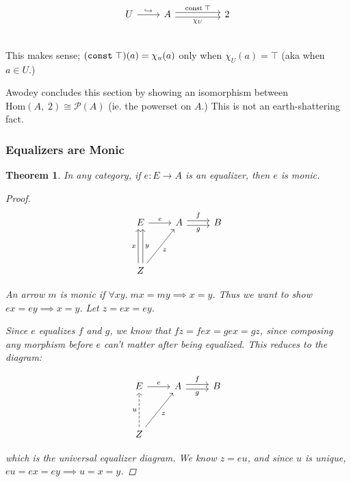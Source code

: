 \documentclass[]{article}
\newtheorem{theorem}{Theorem}
\renewcommand{\hom}[2]{\ensuremath{\text{Hom}(#1,\;#2)}}
\newcommand{\tfarr}[4][\to]{\ensuremath{#2 : #3 #1 #4}}
\begin{document}
$$\begin{tikzcd}
  U\arrow{r}{\hookrightarrow} & A \arrow[shift right=1,swap]{rr}{\chi_U}
  \arrow[shift left=1]{rr}{\text{const}\;\top} &  & 2 \\
\end{tikzcd}$$

This makes sense; $(\text{\texttt{const}}\;\top)(a) = \chi_u(a)$ only when
$\chi_U(a) = \top$ (aka when $a \in U$.)

Awodey concludes this section by showing an isomorphism between $\hom{A}{2}
\cong \mathcal{P}(A)$ (ie. the powerset on $A$.) This is not an earth-shattering
fact.

\subsubsection{Equalizers are Monic}

\begin{theorem}
  In any category, if \tfarr{e}{E}{A} is an equalizer, then $e$ is monic.

  \begin{proof}
$$\begin{tikzcd}
  E\arrow{r}{e} & A \arrow[shift right=1,swap]{r}{g} \arrow[shift left=1]{r}{f} & B \\
  & & \\
  Z \arrow[shift left=1]{uu}{x} \arrow[shift right=1,swap]{uu}{y} \arrow[swap]{uur}{z} & &
\end{tikzcd}$$

  An arrow $m$ is monic if $\forall x y.\; mx = my \implies x = y $. Thus we
  want to show $ex = ey \implies x = y$. Let $z = ex = ey$.

  Since $e$ equalizes $f$ and $g$, we know that $fz = fex = gex = gz$, since
  composing any morphism before $e$ can't matter after being equalized. This
  reduces to the diagram:

$$\begin{tikzcd}
  E\arrow{r}{e} & A \arrow[shift right=1,swap]{r}{g} \arrow[shift left=1]{r}{f} & B \\
  & & \\
  Z \arrow[dashed]{uu}{u}  \arrow[swap]{uur}{z} & &
\end{tikzcd}$$

  which is the universal equalizer diagram. We know $z = eu$, and since $u$ is
  unique, $eu = ex = ey \implies u = x = y$.
  \end{proof}
\end{theorem}
\end{document}
